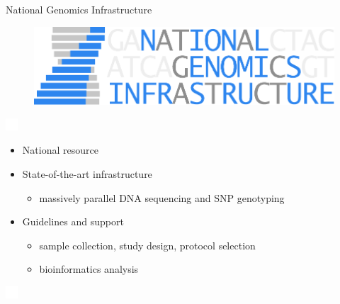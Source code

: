 \documentclass[usepdftitle=false]{beamer}
\begin{document}
\begin{frame}{National Genomics Infrastructure}
	\begin{figure}
		\includegraphics[height=.7cm]{pictures/NGI}
	\end{figure}

	\includegraphics[height=.8cm]{pictures/blank}
	\begin{itemize}
		\item National resource
		\pause
		\item State-of-the-art infrastructure
		\begin{itemize}
			\item massively parallel DNA sequencing and SNP genotyping
		\end{itemize}
		\pause
		\item Guidelines and support
		\begin{itemize}
			\item sample collection, study design, protocol selection
			\item bioinformatics analysis
			\end{itemize}
	\end{itemize}
	\includegraphics[height=.8cm]{pictures/blank}

\end{frame}
\end{document}

